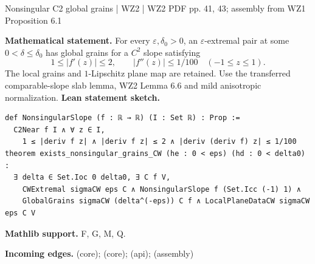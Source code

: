\documentclass[10pt,a4paper]{article}
\newcommand{\nodecard}[1]{\hyperlink{node-#1}{\texttt{\detokenize{#1}}}}
\begin{document}
\begin{minipage}{\linewidth}
\hypertarget{node-W2P6_5}{}
\begin{tcolorbox}[colback=white,colframe=slopefg,colbacktitle=slopebg,coltitle=ink,boxrule=0.45pt,arc=1.6mm,left=3mm,right=3mm,top=2mm,bottom=2mm,title={\sffamily\bfseries WZ2 Proposition 6.5, part 1 double-prime \hfill \texttt{W2P6\_5}}]
{\sffamily\small\color{muted}Nonsingular C2 global grains | WZ2 | WZ2 PDF pp. 41, 43; assembly from WZ1 Proposition 6.1}\par
\textbf{Mathematical statement.} For every $\varepsilon,\delta_0>0$, an $\varepsilon$-extremal pair at some $0<\delta\le\delta_0$ has global grains for a $C^2$ slope satisfying
\[1\le|f'(z)|\le2,\qquad |f''(z)|\le1/100\quad(-1\le z\le1).\]
The local grains and $1$-Lipschitz plane map are retained.
Use the transferred comparable-slope slab lemma, WZ2 Lemma 6.6 and mild anisotropic normalization.
\smallskip\textbf{Lean statement sketch.}
\begin{Verbatim}[fontsize=\small,breaklines=true,breakanywhere=true,tabsize=2]
def NonsingularSlope (f : ℝ → ℝ) (I : Set ℝ) : Prop :=
  C2Near f I ∧ ∀ z ∈ I,
    1 ≤ |deriv f z| ∧ |deriv f z| ≤ 2 ∧ |deriv (deriv f) z| ≤ 1/100
theorem exists_nonsingular_grains_CW (he : 0 < eps) (hd : 0 < delta0) :
  ∃ delta ∈ Set.Ioc 0 delta0, ∃ C f V,
    CWExtremal sigmaCW eps C ∧ NonsingularSlope f (Set.Icc (-1) 1) ∧
    GlobalGrains sigmaCW (delta^(-eps)) C f ∧ LocalPlaneDataCW sigmaCW eps C V
\end{Verbatim}
{\footnotesize\textbf{Mathlib support.} F, G, M, Q.\par
\textbf{Incoming edges.} \nodecard{L6_4} (core); \nodecard{L3_5} (core); \nodecard{Iaffine} (api); \nodecard{W2P6_4} (assembly)\par}

\end{tcolorbox}\end{minipage}\par\medskip
\end{document}
